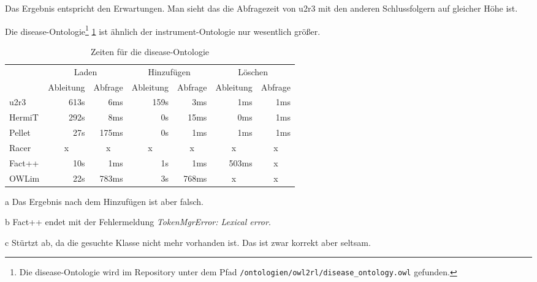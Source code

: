 Das Ergebnis entspricht den Erwartungen. Man sieht das die Abfragezeit von u2r3 mit den anderen Schlussfolgern auf gleicher Höhe ist.

Die disease-Ontologie\footnote{Die disease-Ontologie wird im Repository unter dem Pfad \texttt{/ontologien/owl2rl/disease\_ontology.owl} gefunden.} \ref{table-time-disease} ist ähnlich der instrument-Ontologie nur wesentlich größer.
\begin{table}[htbp]
\caption{Zeiten für die disease-Ontologie}
\label{table-time-disease}
\begin{center}
\begin{threeparttable}
\begin{tabular}{l|r|r|r|r|r|r|}
\cline{2-7}
 & \multicolumn{2}{|c|}{Laden} & \multicolumn{2}{|c|}{Hinzufügen} & \multicolumn{2}{|c|}{Löschen} \\
\cline{2-7}
 & \multicolumn{1}{|c|}{Ableitung} & \multicolumn{1}{|c|}{Abfrage} & \multicolumn{1}{|c|}{Ableitung} & \multicolumn{1}{|c|}{Abfrage} & \multicolumn{1}{|c|}{Ableitung} & \multicolumn{1}{|c|}{Abfrage} \\
\hline
\multicolumn{1}{|l|}{u2r3} & 613s & 6ms & 159s & 3ms & 1ms & 1ms \\ \hline
\multicolumn{1}{|l|}{HermiT\tnote{a}} & 292s & 8ms & 0s & 15ms & 0ms & 1ms \\ \hline
\multicolumn{1}{|l|}{Pellet\tnote{a}} & 27s & 175ms & 0s & 1ms & 1ms & 1ms \\ \hline
\multicolumn{1}{|l|}{Racer\tnote{b}} & \multicolumn{1}{c|}{x} & \multicolumn{1}{c|}{x} & \multicolumn{1}{c|}{x} & \multicolumn{1}{c|}{x} & \multicolumn{1}{c|}{x} & \multicolumn{1}{c|}{x} \\ \hline
\multicolumn{1}{|l|}{Fact++\tnote{c}} & 10s & 1ms & 1s & 1ms & 503ms & \multicolumn{1}{c|}{x} \\ \hline
\multicolumn{1}{|l|}{OWLim} & 22s & 783ms & 3s & 768ms & \multicolumn{1}{c|}{x} & \multicolumn{1}{c|}{x} \\ \hline
\end{tabular}
\begin{tablenotes}
	\item[a] Das Ergebnis nach dem Hinzufügen ist aber falsch.
	\item[b] Fact++ endet mit der Fehlermeldung \emph{TokenMgrError: Lexical error}.
	\item[c] Stürtzt ab, da die gesuchte Klasse nicht mehr vorhanden ist. Das ist zwar korrekt aber seltsam.
\end{tablenotes}
\end{threeparttable}
\end{center}
\end{table}

